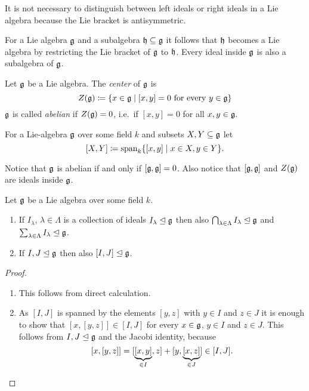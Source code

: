 \begin{rem}
 It is not necessary to distinguish between left ideals or right ideals in a Lie algebra because the Lie bracket is antisymmetric.
\end{rem}


\begin{rem}
 For a Lie algebra $\mathfrak{g}$ and a subalgebra $\mathfrak{h} \subseteq \mathfrak{g}$ it follows that $\mathfrak{h}$ becomes a Lie algebra by restricting the Lie bracket of $\mathfrak{g}$ to $\mathfrak{h}$. Every ideal inside $\mathfrak{g}$ is also a subalgebra of $\mathfrak{g}$.
\end{rem}


\begin{defi}
 Let $\mathfrak{g}$ be a Lie algebra. The \emph{center} of $\mathfrak{g}$ is
 \[
  Z(\mathfrak{g}) \coloneqq \{x \in \mathfrak{g} \mid \text{$[x,y] = 0$ for every $y \in \mathfrak{g}$}\}
 \]
 $\mathfrak{g}$ is called \emph{abelian} if $Z(\mathfrak{g}) = 0$, i.e.\ if $[x,y] = 0$ for all $x,y \in \mathfrak{g}$.
\end{defi}


\begin{defi}
 For a Lie-algebra $\mathfrak{g}$ over some field $k$ and subsets $X, Y \subseteq \mathfrak{g}$ let
 \[
  [X,Y] \coloneqq \operatorname{span}_k \{[x,y] \mid x \in X, y \in Y\}.
 \]
\end{defi}


\begin{rem}
 Notice that $\mathfrak{g}$ is abelian if and only if $[\mathfrak{g},\mathfrak{g}] = 0$. Also notice that $[\mathfrak{g},\mathfrak{g}]$ and $Z(\mathfrak{g})$ are ideals inside $\mathfrak{g}$.
\end{rem}


\begin{lem}
 Let $\mathfrak{g}$ be a Lie algebra over some field $k$.
 \begin{enumerate}[leftmargin=*]
  \item
   If $I_\lambda$, $\lambda \in \Lambda$ is a collection of ideals $I_\lambda \trianglelefteq \mathfrak{g}$ then also $\bigcap_{\lambda \in \Lambda} I_\lambda \trianglelefteq \mathfrak{g}$ and $\sum_{\lambda \in \Lambda} I_\lambda \trianglelefteq \mathfrak{g}$.
  \item
   If $I, J \trianglelefteq \mathfrak{g}$ then also $[I,J] \trianglelefteq \mathfrak{g}$.
 \end{enumerate}
\end{lem}
\begin{proof}
 \begin{enumerate}[leftmargin=*]
  \item
   This follows from direct calculation.
  \item
   As $[I,J]$ is spanned by the elements $[y,z]$ with $y \in I$ and $z \in J$ it is enough to show that $[x,[y,z]] \in [I,J]$ for every $x \in \mathfrak{g}$, $y \in I$ and $z \in J$. This follows from $I, J \trianglelefteq \mathfrak{g}$ and the Jacobi identity, because
   \[
    [x,[y,z]]
    = [\underbrace{[x,y]}_{\in I},z] + [y,\underbrace{[x,z]}_{\in J}]
    \in [I,J].
   \qedhere
   \]
 \end{enumerate}
\end{proof}



